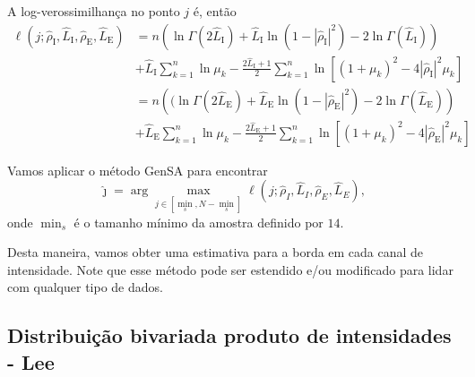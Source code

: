 A log-verossimilhança no ponto $j$ é, então
\begin{equation}\label{eq:TotalLogLikelihood}
\begin{split}
\ell(j;\widehat{\rho}_\text{I}, \widehat{L}_\text{I}, \widehat{\rho}_\text{E}, \widehat{L}_\text{E})&=n\left(\ln\Gamma(2\widehat{L}_\text{I})+\widehat{L}_\text{I}\ln(1-|\widehat{\rho}_\text{I}|^2)-2\ln\Gamma(\widehat{L}_\text{I})\right)\\
                         &+\widehat{L}_\text{I}\sum_{k=1}^{n}\ln\mu_k-\frac{2\widehat{L}_\text{I}+1}{2}\sum_{k=1}^{n} \ln\left[(1+\mu_k)^2-4|\widehat{\rho}_\text{I}|^2\mu_k\right]\\
                         &=n\left((\ln\Gamma(2\widehat{L}_\text{E})+\widehat{L}_\text{E}\ln(1-|\widehat{\rho}_\text{E}|^2)-2\ln\Gamma(\widehat{L}_\text{E})\right)\\
                         &+\widehat{L}_\text{E}\sum_{k=1}^{n}\ln\mu_k-\frac{2\widehat{L}_\text{E}+1}{2}\sum_{k=1}^{n} \ln\left[(1+\mu_k)^2-4|\widehat{\rho}_\text{E}|^2\mu_k\right]
\end{split}
\end{equation}

Vamos aplicar o método GenSA para encontrar
$$
\widehat{\jmath}= \arg\max\limits_{j\in [\min_s,N-\min_s]}\ell(j;\widehat{\rho}_I, \widehat{L}_I,\widehat{\rho}_E, \widehat{L}_E),
$$ 
onde $\min_s$ é o tamanho mínimo da amostra definido por $14$.

Desta maneira, vamos obter uma estimativa para a borda em cada canal de intensidade.
Note que esse método pode ser estendido e/ou modificado para lidar com qualquer tipo de dados.

\subsection{Distribuição bivariada produto de intensidades - Lee } 

